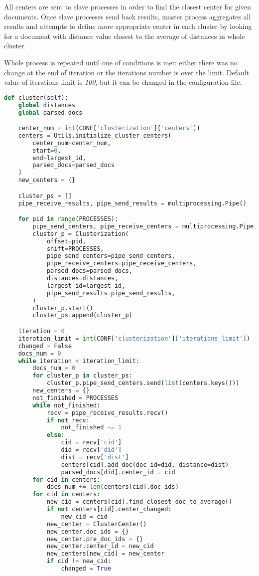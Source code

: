 All centers are sent to slave processes in order to find the closest center for given documents. Once slave processes send back results, master process aggregates all results and attempts to define more appropriate center in each cluster by looking for a document with distance value closest to the average of distances in whole cluster. 

Whole process is repeated until one of conditions is met: either there was no change at the end of iteration or the iterations number is over the limit. Default value of iterations limit is \textit{100}, but it can be changed in the configuration file.

\begin{lstlisting}[language=Python, caption={Main.cluster() - Main process method for conducting clustering}, label={lst:main:cluster}]
def cluster(self):
    global distances
    global parsed_docs

    center_num = int(CONF['clusterization']['centers'])
    centers = Utils.initialize_cluster_centers(
        center_num=center_num,
        start=0,
        end=largest_id,
        parsed_docs=parsed_docs
    )
    new_centers = {}

    cluster_ps = []
    pipe_receive_results, pipe_send_results = multiprocessing.Pipe()

    for pid in range(PROCESSES):
        pipe_send_centers, pipe_receive_centers = multiprocessing.Pipe()
        cluster_p = Clusterization(
            offset=pid,
            shift=PROCESSES,
            pipe_send_centers=pipe_send_centers,
            pipe_receive_centers=pipe_receive_centers,
            parsed_docs=parsed_docs,
            distances=distances,
            largest_id=largest_id,
            pipe_send_results=pipe_send_results,
        )
        cluster_p.start()
        cluster_ps.append(cluster_p)

    iteration = 0
    iteration_limit = int(CONF['clusterization']['iterations_limit'])
    changed = False
    docs_num = 0
    while iteration < iteration_limit:
        docs_num = 0
        for cluster_p in cluster_ps:
            cluster_p.pipe_send_centers.send(list(centers.keys()))
        new_centers = {}
        not_finished = PROCESSES
        while not_finished:
            recv = pipe_receive_results.recv()
            if not recv:
                not_finished -= 1
            else:
                cid = recv['cid']
                did = recv['did']
                dist = recv['dist']
                centers[cid].add_doc(doc_id=did, distance=dist)
                parsed_docs[did].center_id = cid
        for cid in centers:
            docs_num += len(centers[cid].doc_ids)
        for cid in centers:
            new_cid = centers[cid].find_closest_doc_to_average()
            if not centers[cid].center_changed:
                new_cid = cid
            new_center = ClusterCenter()
            new_center.doc_ids = {}
            new_center.pre_doc_ids = {}
            new_center.center_id = new_cid
            new_centers[new_cid] = new_center
            if cid != new_cid:
                changed = True


\end{lstlisting}
